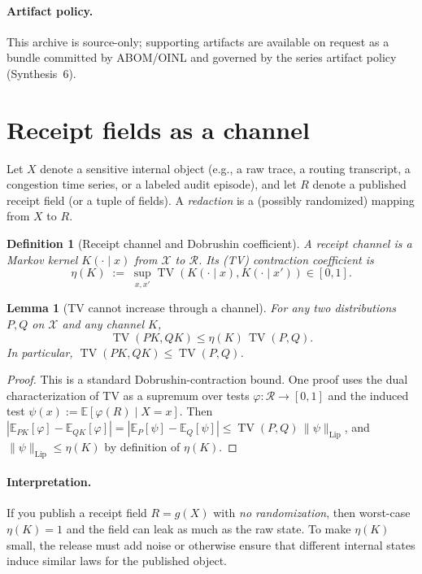 \documentclass[11pt]{article}
\newtheorem{lemma}{Lemma}
\newtheorem{definition}{Definition}
\DeclareMathOperator{\TV}{TV}
\begin{document}
\paragraph{Artifact policy.}
This archive is source-only; supporting artifacts are available on request as a bundle committed by ABOM/OINL and governed by the series artifact policy (Synthesis~6).\cite{series:artifactpolicy}

\section{Receipt fields as a channel}
Let $X$ denote a sensitive internal object (e.g., a raw trace, a routing transcript, a congestion time series, or a labeled audit episode),
and let $R$ denote a published receipt field (or a tuple of fields).
A \emph{redaction} is a (possibly randomized) mapping from $X$ to $R$.

\begin{definition}[Receipt channel and Dobrushin coefficient]
A receipt channel is a Markov kernel $K(\cdot\mid x)$ from $\mathcal{X}$ to $\mathcal{R}$.
Its (TV) contraction coefficient is
\[
\eta(K) \;:=\; \sup_{x,x'} \TV\!\left(K(\cdot\mid x),K(\cdot\mid x')\right)\in[0,1].
\]
\end{definition}

\begin{lemma}[TV cannot increase through a channel]
For any two distributions $P,Q$ on $\mathcal{X}$ and any channel $K$,
\[
\TV(PK,QK) \le \eta(K)\,\TV(P,Q).
\]
In particular, $\TV(PK,QK)\le \TV(P,Q)$.
\end{lemma}

\begin{proof}
This is a standard Dobrushin-contraction bound.
One proof uses the dual characterization of TV as a supremum over tests $\varphi:\mathcal{R}\to[0,1]$ and the induced test $\psi(x):=\mathbb{E}[\varphi(R)\mid X=x]$.
Then $|\mathbb{E}_{PK}[\varphi]-\mathbb{E}_{QK}[\varphi]|=|\mathbb{E}_{P}[\psi]-\mathbb{E}_{Q}[\psi]| \le \TV(P,Q)\,\|\psi\|_{\mathrm{Lip}}$,
and $\|\psi\|_{\mathrm{Lip}}\le \eta(K)$ by definition of $\eta(K)$.
\end{proof}

\paragraph{Interpretation.}
If you publish a receipt field $R=g(X)$ with \emph{no randomization}, then worst-case $\eta(K)=1$ and the field can leak as much as the raw state.
To make $\eta(K)$ small, the release must add noise or otherwise ensure that different internal states induce similar laws for the published object.
\end{document}
